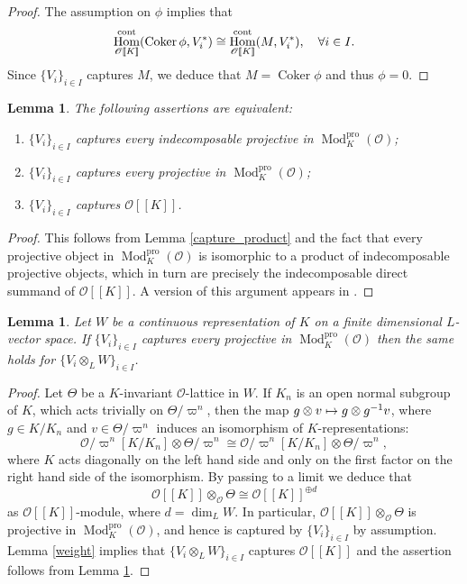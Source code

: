 \documentclass[JEP,XML,SOM,Unicode,NoEqCountersInSection]{cedram}
\let\mathcal\mathscr
\newenvironment{enumeratei}
{\bgroup\def\theenumi{\roman{enumi}}\def\theenumii{\arabic{enumii}}\begin{enumerate}}
{\end{enumerate}\egroup}
\newcommand\mto{\mathchoice{\longmapsto}{\mapsto}{\mapsto}{\mapsto}}
\newtheorem{lem}[prop]{Lemma}
\theoremstyle{definition}
\DeclareMathOperator{\Hom}{Hom}
\DeclareMathOperator{\Coker}{Coker}
\DeclareMathOperator{\Mod}{Mod}
\newcommand{\br}[1]{[\![#1]\!]}
\newcommand{\cO}{\mathcal{O}}
\newcommand{\pro}{\mathrm{pro}}
\begin{document}
\begin{proof} The assumption on $\phi$ implies that\vspace*{-3pt}\enlargethispage{.5\baselineskip}%
\[
\Hom_{\cO\br{K}}^{\rm cont}(\Coker \phi, V_i^*)\cong \Hom_{\cO\br{K}}^{\rm cont}(M, V_i^*), \quad \forall i\in I.
\]
Since $\{V_i\}_{i\in I}$ captures $M$, we
deduce that $M=\Coker \phi$ and thus $\phi=0$.
\end{proof}

\begin{lem}\label{product} The following assertions are equivalent:
\begin{enumeratei}
\item
$\{V_i\}_{i\in I}$ captures every indecomposable projective in $\Mod^{\pro}_{K}(\cO)$;
\item
$\{V_i\}_{i\in I}$ captures every projective in $\Mod^{\pro}_{K}(\cO)$;
\item
$\{V_i\}_{i\in I}$ captures $\cO\br{K}$.
\end{enumeratei}
\end{lem}

\begin{proof} This follows from Lemma \ref{capture_product} and the fact that every projective object in $\Mod^{\pro}_K(\cO)$ is isomorphic to a product of indecomposable projective objects, which in turn are precisely the indecomposable
direct summand of $\cO\br{K}$. A version of this argument appears in \cite[Lem.\,2.11]{CDP}.
\end{proof}

\begin{lem}\label{weight_proj} Let $W$ be a continuous representation of $K$ on a finite dimensional $L$-vector space. If $\{V_i\}_{i\in I}$ captures every projective in $\Mod^{\pro}_{K}(\cO)$
then the same holds for $\{V_i \otimes_L W\}_{i\in I}$.
\end{lem}

\begin{proof} Let $\Theta$ be a $K$-invariant $\cO$-lattice in $W$. If $K_n$ is an open normal subgroup of $K$, which acts trivially on $\Theta/\varpi^n$, then
the map $g \otimes v \mto g \otimes g^{-1} v$, where $g\in K/K_n$ and $v \in \Theta/\varpi^n$ induces an isomorphism of $K$-representations:
\[
\cO/\varpi^n [ K/K_n] \otimes \Theta/\varpi^n \cong \cO/\varpi^n [ K/K_n] \otimes \Theta/\varpi^n,
\]
where $K$ acts diagonally on the left hand side and only on the first factor on the right hand side of the isomorphism. By passing to a limit we deduce that
\[
\cO\br{K}\otimes_{\cO} \Theta\cong \cO\br{K}^{\oplus d}
\]
as $\cO\br{K}$-module, where $d=\dim_L W$.
In particular, $\cO\br{K}\otimes_{\cO} \Theta$ is projective in $\Mod^{\pro}_{K}(\cO)$, and hence is captured by $\{V_i\}_{i\in I}$ by assumption. Lemma \ref{weight} implies that
$\{V_i\otimes_L W\}_{i \in I}$ captures $\cO\br{K}$ and the assertion follows from Lemma \ref{product}.
\end{proof}
\end{document}
